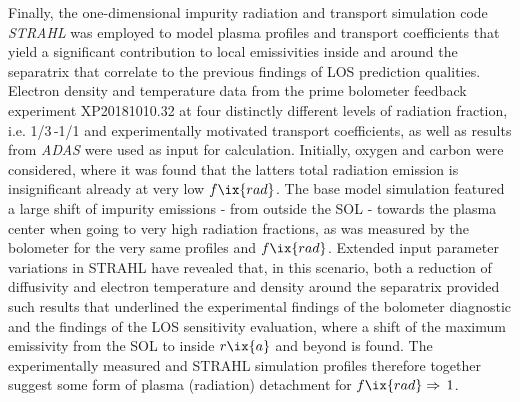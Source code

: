         Finally, the one-dimensional impurity radiation and transport simulation code \textit{STRAHL} was employed to model plasma profiles and transport coefficients that yield a significant contribution to local emissivities inside and around the separatrix that correlate to the previous findings of LOS prediction qualities. Electron density and temperature data from the prime bolometer feedback experiment XP20181010.32 at four distinctly different levels of radiation fraction, i.e. 1/3\,-1/1 and experimentally motivated transport coefficients, as well as results from \textit{ADAS} were used as input for calculation. Initially, oxygen and carbon were considered, where it was found that the latters total radiation emission is insignificant already at very low $f\ix{rad}$. The base model simulation featured a large shift of impurity emissions - from outside the SOL - towards the plasma center when going to very high radiation fractions, as was measured by the bolometer for the very same profiles and $f\ix{rad}$. Extended input parameter variations in STRAHL have revealed that, in this scenario, both a reduction of diffusivity and electron temperature and density around the separatrix provided such results that underlined the experimental findings of the bolometer diagnostic and the findings of the LOS sensitivity evaluation, where a shift of the maximum emissivity from the SOL to inside $r\ix{a}$ and beyond is found. The experimentally measured and STRAHL simulation profiles therefore together suggest some form of plasma (radiation) detachment for $f\ix{rad}\Rightarrow\,1$.\\%
